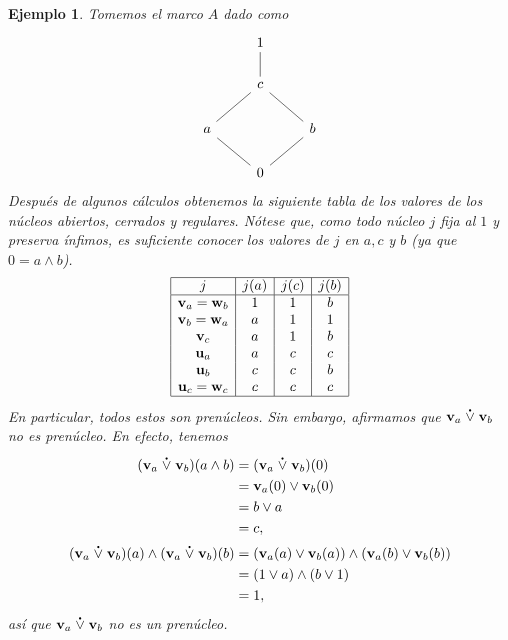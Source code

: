 \documentclass[12pt,letterpaper,titlepage]{article}
\newtheorem*{exa}{Ejemplo}
\theoremstyle{definition}
\renewcommand\sup{\vee}
\renewcommand\inf{\wedge}
\newcommand\psup{%
    {\;\stackrel{\raisebox{-3pt}{\scalebox{0.4}{$\bullet$}}}{\vee}\;}
  }%
\newcommand\unuc[1]{\mathbf u_{#1}}
\newcommand\vnuc[1]{\mathbf v_{#1}}
\newcommand\wnuc[1]{\mathbf w_{#1}}
\newcommand\<{\langle}
\renewcommand\>{\rangle}
\begin{document}
\begin{exa}
  Tomemos el marco $A$ dado como
  \[
    \begin{tikzcd}
      & 1 \\
      & c \ar[u,no head] \\
      a \ar[ur,no head] & & b \ar[ul,no head] \\
      & 0 \ar[ur, no head] \ar[ul, no head]
    \end{tikzcd}
  \]
  Después de algunos cálculos obtenemos la siguiente tabla de
  los valores de los núcleos abiertos, cerrados y regulares.
  Nótese que, como todo núcleo $j$ fija al $1$ y preserva ínfimos,
  es suficiente conocer los valores de $j$ en $a,c$ y $b$
  (ya que $0=a\inf b$).
    \[ 
        \begin{array}{|c|c|c|c|}
            \hline
            j & j(a) & j(c) & j(b) \\
            \hline
            \vnuc a = \wnuc b & 1 & 1 & b \\
            \vnuc b = \wnuc a & a & 1 & 1 \\
            \vnuc c & a & 1 & b \\
            \unuc a & a & c & c \\
            \unuc b & c & c & b \\
            \unuc c = \wnuc c & c & c & c \\
            \hline
        \end{array}
    \]
    En particular, todos estos son prenúcleos.
    Sin embargo, afirmamos que $\vnuc a \psup \vnuc b$ no es prenúcleo.
    En efecto, tenemos
    \begin{align*}
        (\vnuc a \psup \vnuc b)(a\inf b)
        &= (\vnuc a \psup \vnuc b)(0) \\
        &= \vnuc a(0) \sup \vnuc b(0) \\
        &= b \sup a \\
        &= c,
        \\
        (\vnuc a \psup \vnuc b)(a)
        \inf (\vnuc a \psup \vnuc b)(b)
        &= (\vnuc a(a)\sup\vnuc b(a))
            \inf
            (\vnuc a(b)\sup\vnuc b(b)) \\
        &= (1\sup a)\inf(b\sup 1) \\
        &= 1,
    \end{align*}
    así que $\vnuc a\psup\vnuc b$ no es un prenúcleo.
\end{exa}
\end{document}
